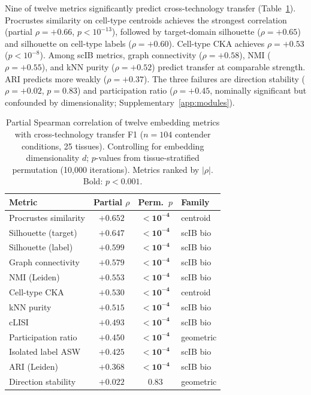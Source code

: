 \documentclass[11pt]{article}
\begin{document}
Nine of twelve metrics significantly predict cross-technology transfer
(Table~\ref{tab:metrics}). Procrustes similarity on cell-type centroids
achieves the strongest correlation (partial $\rho = +0.66$,
$p < 10^{-13}$), followed by target-domain silhouette ($\rho = +0.65$)
and silhouette on cell-type labels ($\rho = +0.60$). Cell-type CKA
achieves $\rho = +0.53$ ($p < 10^{-8}$). Among scIB metrics, graph
connectivity ($\rho = +0.58$), NMI ($\rho = +0.55$), and kNN purity
($\rho = +0.52$) predict transfer at comparable strength. ARI predicts
more weakly ($\rho = +0.37$). The three failures are
direction stability ($\rho = +0.02$, $p = 0.83$) and
participation ratio ($\rho = +0.45$, nominally significant but
confounded by dimensionality; Supplementary~\ref{app:modules}).

\medskip
\begin{table}[t]
\centering
\caption{Partial Spearman correlation of twelve embedding metrics with
cross-technology transfer F1 ($n = 104$ contender conditions, 25
tissues). Controlling for embedding dimensionality $d$; $p$-values from
tissue-stratified permutation (10,000 iterations). Metrics ranked by
$|\rho|$. Bold: $p < 0.001$.}
\label{tab:metrics}
\small
\begin{tabular}{@{}lccl@{}}
\toprule
Metric & Partial $\rho$ & Perm.\ $p$ & Family \\
\midrule
Procrustes similarity   & $+0.652$ & $\mathbf{< 10^{-4}}$ & centroid \\
Silhouette (target)     & $+0.647$ & $\mathbf{< 10^{-4}}$ & scIB bio \\
Silhouette (label)      & $+0.599$ & $\mathbf{< 10^{-4}}$ & scIB bio \\
Graph connectivity      & $+0.579$ & $\mathbf{< 10^{-4}}$ & scIB bio \\
NMI (Leiden)            & $+0.553$ & $\mathbf{< 10^{-4}}$ & scIB bio \\
Cell-type CKA           & $+0.530$ & $\mathbf{< 10^{-4}}$ & centroid \\
kNN purity              & $+0.515$ & $\mathbf{< 10^{-4}}$ & scIB bio \\
cLISI                   & $+0.493$ & $\mathbf{< 10^{-4}}$ & scIB bio \\
Participation ratio     & $+0.450$ & $\mathbf{< 10^{-4}}$ & geometric \\
Isolated label ASW      & $+0.425$ & $\mathbf{< 10^{-4}}$ & scIB bio \\
ARI (Leiden)            & $+0.368$ & $\mathbf{< 10^{-4}}$ & scIB bio \\
Direction stability     & $+0.022$ & $0.83$               & geometric \\
\bottomrule
\end{tabular}
\end{table}
\end{document}
